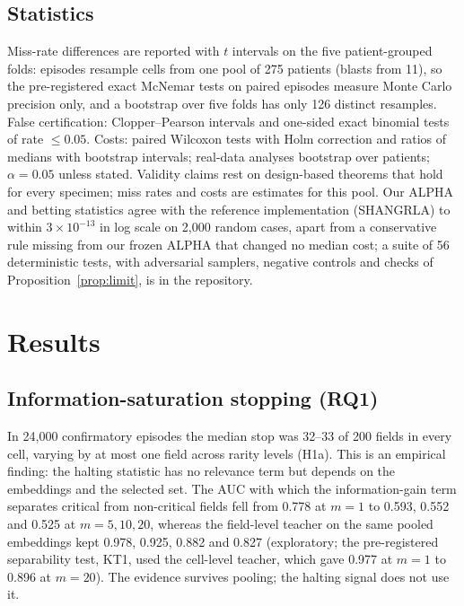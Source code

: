 \documentclass[journal]{IEEEtran}
\begin{document}
\subsection{Statistics}
Miss-rate differences are reported with $t$ intervals on the five patient-grouped folds: episodes resample cells from one pool of 275 patients (blasts from 11), so the pre-registered exact McNemar tests on paired episodes measure Monte Carlo precision only, and a bootstrap over five folds has only 126 distinct resamples. False certification: Clopper--Pearson intervals and one-sided exact binomial tests of rate $\le0.05$. Costs: paired Wilcoxon tests with Holm correction and ratios of medians with bootstrap intervals; real-data analyses bootstrap over patients; $\alpha=0.05$ unless stated. Validity claims rest on design-based theorems that hold for every specimen; miss rates and costs are estimates for this pool. Our ALPHA and betting statistics agree with the reference implementation (SHANGRLA) to within $3\times10^{-13}$ in log scale on 2,000 random cases, apart from a conservative rule missing from our frozen ALPHA that changed no median cost; a suite of 56 deterministic tests, with adversarial samplers, negative controls and checks of Proposition~\ref{prop:limit}, is in the repository.

\section{Results}
\subsection{Information-saturation stopping (RQ1)}\label{sec:partI}
In 24,000 confirmatory episodes the median stop was 32--33 of 200 fields in every cell, varying by at most one field across rarity levels (H1a). This is an empirical finding: the halting statistic has no relevance term but depends on the embeddings and the selected set. The AUC with which the information-gain term separates critical from non-critical fields fell from 0.778 at $m=1$ to 0.593, 0.552 and 0.525 at $m=5,10,20$, whereas the field-level teacher on the same pooled embeddings kept 0.978, 0.925, 0.882 and 0.827 (exploratory; the pre-registered separability test, KT1, used the cell-level teacher, which gave 0.977 at $m=1$ to 0.896 at $m=20$). The evidence survives pooling; the halting signal does not use it.
\end{document}
